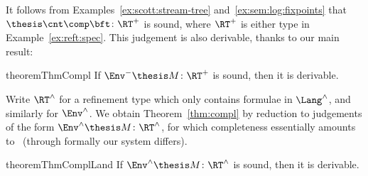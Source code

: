 It follows from Examples~\ref{ex:scott:stream-tree} and~\ref{ex:sem:log:fixpoints}
that $\thesis \cnt \comp \bft \colon \RT^+$
is sound, where $\RT^+$ is either type in Example~\ref{ex:reft:spec}.
This judgement is also derivable, thanks to our main result:

\begin{restatable}{theorem}{ThmCompl}
\label{thm:compl}
If $\Env^- \thesis M\colon \RT^+$ is sound,
then it is derivable.
\end{restatable}

Write $\RT^\land$ for a refinement type which only contains formulae in $\Lang^\land$,
and similarly for $\Env^\land$.
We obtain Theorem~\ref{thm:compl} by reduction to 
judgements of the form $\Env^\land \thesis M \colon \RT^\land$,
for which completeness essentially amounts to~\cite{abramsky91apal}
(through formally our system differs).


\begin{restatable}{theorem}{ThmComplLand}
\label{thm:compl:land}
If $\Env^\land \thesis M \colon \RT^\land$ is sound,
then it is derivable.
\end{restatable}



